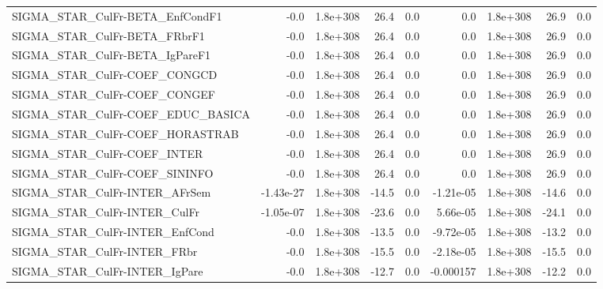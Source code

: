 \begin{tabular}{lrrrrrrrr}
SIGMA\_STAR\_CulFr-BETA\_EnfCondF1      &        -0.0 &     1.8e+308 &    26.4 &      0.0 &        0.0 &    1.8e+308 &         26.9 &           0.0 \\
SIGMA\_STAR\_CulFr-BETA\_FRbrF1         &        -0.0 &     1.8e+308 &    26.4 &      0.0 &        0.0 &    1.8e+308 &         26.9 &           0.0 \\
SIGMA\_STAR\_CulFr-BETA\_IgPareF1       &        -0.0 &     1.8e+308 &    26.4 &      0.0 &        0.0 &    1.8e+308 &         26.9 &           0.0 \\
SIGMA\_STAR\_CulFr-COEF\_CONGCD         &        -0.0 &     1.8e+308 &    26.4 &      0.0 &        0.0 &    1.8e+308 &         26.9 &           0.0 \\
SIGMA\_STAR\_CulFr-COEF\_CONGEF         &        -0.0 &     1.8e+308 &    26.4 &      0.0 &        0.0 &    1.8e+308 &         26.9 &           0.0 \\
SIGMA\_STAR\_CulFr-COEF\_EDUC\_BASICA    &        -0.0 &     1.8e+308 &    26.4 &      0.0 &        0.0 &    1.8e+308 &         26.9 &           0.0 \\
SIGMA\_STAR\_CulFr-COEF\_HORASTRAB      &        -0.0 &     1.8e+308 &    26.4 &      0.0 &        0.0 &    1.8e+308 &         26.9 &           0.0 \\
SIGMA\_STAR\_CulFr-COEF\_INTER          &        -0.0 &     1.8e+308 &    26.4 &      0.0 &        0.0 &    1.8e+308 &         26.9 &           0.0 \\
SIGMA\_STAR\_CulFr-COEF\_SININFO        &        -0.0 &     1.8e+308 &    26.4 &      0.0 &        0.0 &    1.8e+308 &         26.9 &           0.0 \\
SIGMA\_STAR\_CulFr-INTER\_AFrSem        &   -1.43e-27 &     1.8e+308 &   -14.5 &      0.0 &  -1.21e-05 &    1.8e+308 &        -14.6 &           0.0 \\
SIGMA\_STAR\_CulFr-INTER\_CulFr         &   -1.05e-07 &     1.8e+308 &   -23.6 &      0.0 &   5.66e-05 &    1.8e+308 &        -24.1 &           0.0 \\
SIGMA\_STAR\_CulFr-INTER\_EnfCond       &        -0.0 &     1.8e+308 &   -13.5 &      0.0 &  -9.72e-05 &    1.8e+308 &        -13.2 &           0.0 \\
SIGMA\_STAR\_CulFr-INTER\_FRbr          &        -0.0 &     1.8e+308 &   -15.5 &      0.0 &  -2.18e-05 &    1.8e+308 &        -15.5 &           0.0 \\
SIGMA\_STAR\_CulFr-INTER\_IgPare        &        -0.0 &     1.8e+308 &   -12.7 &      0.0 &  -0.000157 &    1.8e+308 &        -12.2 &           0.0 \\

\end{tabular}
